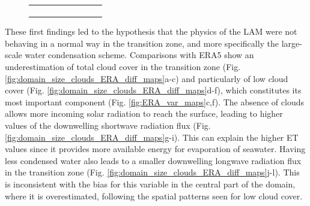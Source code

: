 \begin{figure}[htbp]
\begin{tabular}{ccc}
\begin{subfigure}[b]{0.33\textwidth}
        \end{subfigure} 
    \end{tabular}
    \caption{}
    \label{fig:domain_size_P_ET_ERA_diff_maps}
\end{figure}

These first findings led to the hypothesis that the physics of the LAM were not behaving in a normal way in the transition zone, and more specifically the large-scale water condensation scheme. 
Comparisons with ERA5 show an underestimation of total cloud cover in the transition zone (Fig. \ref{fig:domain_size_clouds_ERA_diff_maps}a-c) and particularly of low cloud cover (Fig. \ref{fig:domain_size_clouds_ERA_diff_maps}d-f), which constitutes its most important component (Fig. \ref{fig:ERA_var_maps}c,f).
The absence of clouds allows more incoming solar radiation to reach the surface, leading to higher values of the downwelling shortwave radiation flux (Fig. \ref{fig:domain_size_clouds_ERA_diff_maps}g-i). This can explain the higher ET values since it provides more available energy for evaporation of seawater.
Having less condensed water also leads to a smaller downwelling longwave radiation flux in the transition zone (Fig. \ref{fig:domain_size_clouds_ERA_diff_maps}j-l). This is inconsistent with the bias for this variable in the central part of the domain, where it is overestimated, following the spatial patterns seen for low cloud cover.


